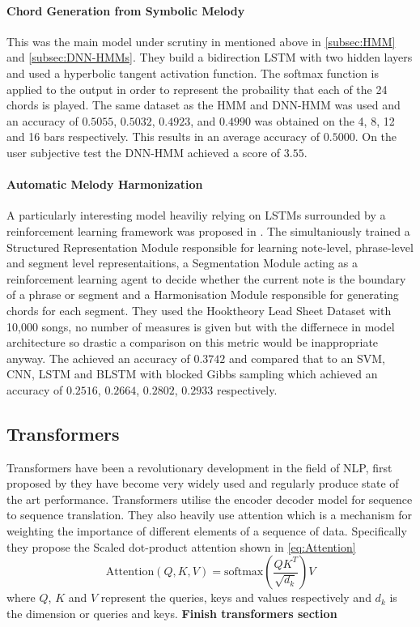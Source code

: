 \paragraph{Chord Generation from Symbolic Melody} This was the main model under scrutiny in \cite{BLSTM} mentioned above in \ref{subsec:HMM} and \ref{subsec:DNN-HMMs}.
They build a bidirection LSTM with two hidden layers and used a hyperbolic tangent activation function. The softmax function is applied to the output in order to represent the probaility that each of the 24 chords is played.
The same dataset as the HMM and DNN-HMM was used and an accuracy of $0.5055$, $0.5032$, $0.4923$, and $0.4990$  was obtained on the 4, 8, 12 and 16 bars respectively. This results in an average accuracy of $0.5000$.
On the user subjective test the DNN-HMM achieved a score of $3.55$.

\paragraph{Automatic Melody Harmonization} A particularly interesting model heaviliy relying on LSTMs surrounded by a reinforcement learning framework was proposed in \cite{ReinforcementLearning}.
The simultaniously trained a Structured Representation Module responsible for learning note-level, phrase-level and segment level representaitions, a Segmentation Module acting as a reinforcement learning agent to decide whether the current note is the boundary of a phrase or segment and a Harmonisation Module responsible for generating chords for each segment.
They used the Hooktheory Lead Sheet Dataset with 10,000 songs, no number of measures is given but with the differnece in model architecture so drastic a comparison on this metric would be inappropriate anyway.
The achieved an accuracy of $0.3742$ and compared that to an SVM, CNN, LSTM and BLSTM with blocked Gibbs sampling which achieved an accuracy of $0.2516$, $0.2664$, $0.2802$, $0.2933$ respectively.

\subsection{Transformers}

Transformers have been a revolutionary development in the field of NLP, first proposed by \cite{Transformers} they have become very widely used and regularly produce state of the art performance.
Transformers utilise the encoder decoder model for sequence to sequence translation.
They also heavily use attention which is a mechanism for weighting the importance of different elements of a sequence of data.
Specifically they propose the Scaled dot-product attention shown in \ref{eq:Attention}
\begin{equation}
    \text{Attention}(Q,K,V) = \text{softmax}(\frac{QK^T}{\sqrt{d_k}})V
    \label{eq:Attention}
\end{equation}
where $Q$, $K$ and $V$ represent the queries, keys and values respectively and $d_k$ is the dimension or queries and keys.
\textbf{Finish transformers section}

